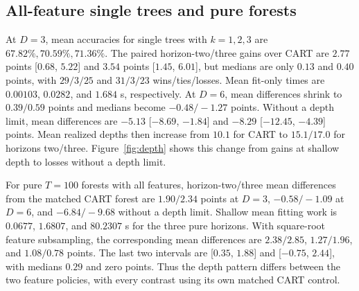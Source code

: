 \documentclass[final,5p,times]{elsarticle}
\begin{document}
\subsection{All-feature single trees and pure forests}
At $D=3$, mean accuracies for single trees with $k=1,2,3$ are
$67.82\%,70.59\%,71.36\%$. The paired horizon-two/three gains over
CART are $2.77$ points [$0.68$, $5.22$] and $3.54$ points [$1.45$,
$6.01$], but medians are only $0.13$ and $0.40$ points, with
$29/3/25$ and $31/3/23$ wins/ties/losses. Mean fit-only times are
$0.00103$, $0.0282$, and $1.684$ s, respectively. At $D=6$, mean
differences shrink to $0.39/0.59$ points and medians become
$-0.48/-1.27$ points. Without a depth limit, mean differences are
$-5.13$ [$-8.69$, $-1.84$] and $-8.29$ [$-12.45$, $-4.39$]
points. Mean realized depths then increase from $10.1$ for CART to
$15.1/17.0$ for horizons two/three. Figure~\ref{fig:depth} shows this
change from gains at shallow depth to losses without a depth limit.

For pure $T=100$ forests with all features, horizon-two/three mean
differences from the matched CART forest are $1.90/2.34$ points at
$D=3$, $-0.58/-1.09$ at $D=6$, and $-6.84/-9.68$ without a depth
limit. Shallow mean fitting work is $0.0677$, $1.6807$, and $80.2307$
s for the three pure horizons. With square-root feature subsampling,
the corresponding mean differences are $2.38/2.85$, $1.27/1.96$,
and $1.08/0.78$ points. The last two intervals are [$0.35$, $1.88$]
and [$-0.75$, $2.44$], with medians $0.29$ and zero points.
Thus the depth pattern differs between the two feature policies,
with every contrast using its own matched CART control.
\end{document}
